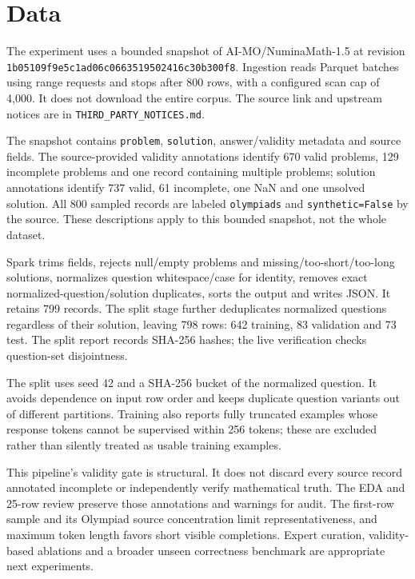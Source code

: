\documentclass[11pt,a4paper]{article}
\begin{document}
\clearpage
\section*{Data}
The experiment uses a bounded snapshot of AI-MO/NuminaMath-1.5 at revision \texttt{1b05109f\allowbreak{}9e5c1ad0\allowbreak{}6c066351\allowbreak{}9502416c\allowbreak{}30b300f8}. Ingestion reads Parquet batches using range requests and stops after 800 rows, with a configured scan cap of 4,000. It does not download the entire corpus. The source link and upstream notices are in \texttt{THIRD\_\allowbreak{}PARTY\_\allowbreak{}NOTICES.\allowbreak{}md}.

The snapshot contains \texttt{problem}, \texttt{solution}, answer/validity metadata and source fields. The source-provided validity annotations identify 670 valid problems, 129 incomplete problems and one record containing multiple problems; solution annotations identify 737 valid, 61 incomplete, one NaN and one unsolved solution. All 800 sampled records are labeled \texttt{olympiads} and \texttt{synthetic=False} by the source. These descriptions apply to this bounded snapshot, not the whole dataset.

Spark trims fields, rejects null/empty problems and missing/too-short/too-long solutions, normalizes question whitespace/case for identity, removes exact normalized-question/solution duplicates, sorts the output and writes JSON. It retains 799 records. The split stage further deduplicates normalized questions regardless of their solution, leaving 798 rows: 642 training, 83 validation and 73 test. The split report records SHA-256 hashes; the live verification checks question-set disjointness.

The split uses seed 42 and a SHA-256 bucket of the normalized question. It avoids dependence on input row order and keeps duplicate question variants out of different partitions. Training also reports fully truncated examples whose response tokens cannot be supervised within 256 tokens; these are excluded rather than silently treated as usable training examples.

This pipeline's validity gate is structural. It does not discard every source record annotated incomplete or independently verify mathematical truth. The EDA and 25-row review preserve those annotations and warnings for audit. The first-row sample and its Olympiad source concentration limit representativeness, and maximum token length favors short visible completions. Expert curation, validity-based ablations and a broader unseen correctness benchmark are appropriate next experiments.
\end{document}
